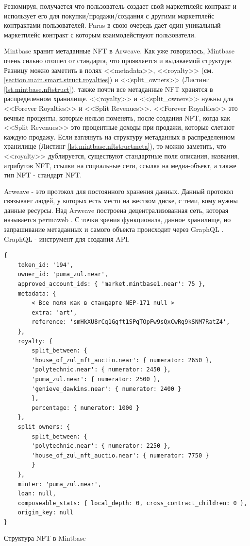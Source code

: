 Резюмируя, получается что пользователь создает свой маркетплейс контракт и использует его для покупки/продажи/создания с другими маркетплейс контрактами пользователей. Paras в свою очередь дает один уникальный маркетплейс контракт с которым взаимодействуют пользователи.

Mintbase хранит метаданные NFT в Arweave. Как уже говорилось, Mintbase очень сильно отошел от стандарта, что проявляется и выдаваемой структуре. Разницу можно заметить в полях <<metadata>>, <<royalty>> (см. {\color{blue} \ref{section.main.smart.struct.royalties}}) и <<split\_owners>> (Листинг {\color{blue} \ref{lst.mintbase.nftstruct}}), также почти все метаданные NFT хранятся в распределенном хранилище. <<royalty>> и <<split\_owners>> нужны для <<Forever Royalties>> и <<Split Revenues>>. <<Forever Royalties>> это вечные проценты, которые нельзя поменять, после создания NFT, когда как <<Split Revenues>> это процентные доходы при продажи, которые слетают каждую продажу. Если взглянуть на структуру метаданных в распределенном хранилище (Листинг {\color{blue} \ref{lst.mintbase.nftstructmeta}}), то можно заметить, что <<royalty>> дублируется, существуют стандартные поля описания, названия, атрибутов NFT, ссылки на социальные сети, ссылка на медиа-объект, а также тип NFT - стандарт NFT.

\begin{definition}
    Arweave \cite{arweave} - это протокол для постоянного хранения данных. Данный протокол связывает людей, у которых есть место на жестком диске, с теми, кому нужны данные ресурсы. Над Arweave построена децентрализованная сеть, которая называется permaweb \cite{permaweb}. С точки зрения функционала, данное хранилище, но запрашивание метаданных и самого объекта происходит через GraphQL \cite{graphql}. GraphQL - инструмент для создания API.
\end{definition}

\begin{listing}
\begin{verbatim}
{
    token_id: '194',
    owner_id: 'puma_zul.near',
    approved_account_ids: { 'market.mintbase1.near': 75 },
    metadata: {
        < Все поля как в стандарте NEP-171 null >
        extra: 'art',
        reference: 'smHkXU8rCq1Ggft1SPqTOpFw9sQxCwRg9kSNM7RatZ4',
    },
    royalty: {
        split_between: {
        'house_of_zul_nft_auctio.near': { numerator: 2650 },
        'polytechnic.near': { numerator: 2450 },
        'puma_zul.near': { numerator: 2500 },
        'genieve_dawkins.near': { numerator: 2400 }
        },
        percentage: { numerator: 1000 }
    },
    split_owners: {
        split_between: {
        'polytechnic.near': { numerator: 2250 },
        'house_of_zul_nft_auctio.near': { numerator: 7750 }
        }
    },
    minter: 'puma_zul.near',
    loan: null,
    composeable_stats: { local_depth: 0, cross_contract_children: 0 },
    origin_key: null
}

\end{verbatim}
\caption{Структура NFT в Mintbase}
\label{lst.mintbase.nftstruct}
\end{listing}

